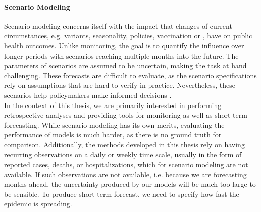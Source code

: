 \paragraph{Scenario Modeling}
Scenario modeling concerns itself with the impact that changes of current circumstances, e.g. variants, seasonality, policies, vaccination or , have on public health outcomes. Unlike monitoring, the goal is to quantify the influence over longer periods with scenarios reaching multiple months into the future. The parameters of scenarios are assumed to be uncertain, making the task at hand challenging. These forecasts are difficult to evaluate, as the scenario specifications rely on assumptions that are hard to verify in practice. Nevertheless, these scenarios help policymakers make informed decisions \citep{Borchering2023Public}.\\[20pt]
%
In the context of this thesis, we are primarily interested in performing retrospective analyses and providing tools for monitoring as well as short-term forecasting. While scenario modeling has its own merits, evaluating the performance of models is much harder, as there is no ground truth for comparison. Additionally, the methods developed in this thesis rely on having recurring observations on a daily or weekly time scale, usually in the form of reported cases, deaths, or hospitalizations, which for scenario modeling are not available. If such observations are not available, i.e. because we are forecasting months ahead, the uncertainty produced by our models will be much too large to be sensible. To produce short-term forecast, we need to specify how fast the epidemic is spreading.